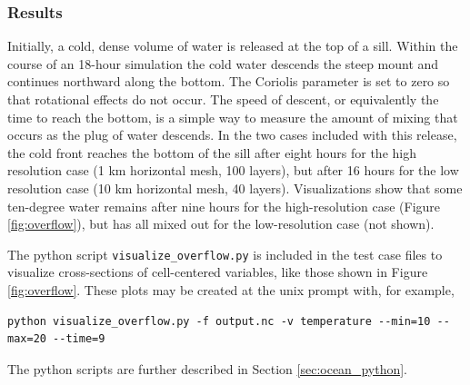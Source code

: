 \subsubsection{Results}
\label{subsubsec:overflow_results}
Initially, a cold, dense volume of water is released at the top of a sill.  Within the course of an 18-hour simulation the cold water descends the steep mount and continues northward along the bottom.  The Coriolis parameter is set to zero so that rotational effects do not occur.  The speed of descent, or equivalently the time to reach the bottom, is a simple way to measure the amount of mixing that occurs as the plug of water descends.  In the two cases included with this release, the cold front reaches the bottom of the sill after eight hours for the high resolution case (1 km horizontal mesh, 100 layers), but after 16 hours for the low resolution case (10 km horizontal mesh, 40 layers).  Visualizations show that some ten-degree water remains after nine hours for the high-resolution case (Figure \ref{fig:overflow}), but has all mixed out for the low-resolution case (not shown).

The python script \verb|visualize_overflow.py| is included in the test case files to visualize cross-sections of cell-centered variables, like those shown in Figure \ref{fig:overflow}.  These plots may be created at the unix prompt with, for example,
\begin{verbatim}
python visualize_overflow.py -f output.nc -v temperature --min=10 --max=20 --time=9
\end{verbatim}
The python scripts are further described in Section \ref{sec:ocean_python}.


